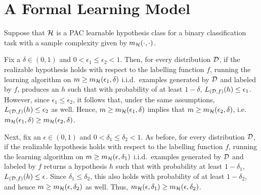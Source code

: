 \chapter{A Formal Learning Model}

\begin{ex}
  Suppose that $\mathcal{H}$ is a PAC learnable hypothesis class for a binary
  classification task with a sample complexity given by $m_{\mathcal{H}}(\cdot,\cdot)$.

  Fix a $\delta\in (0,1)$ and
  $0<\epsilon_1\leq\epsilon_2<1$. Then, for every distribution $\mathcal{D}$, if the
  realizable hypothesis holds with respect to the labelling function $f$,
  running the learning algorithm on $m\geq m_{\mathcal{H}}(\epsilon_1, \delta)$ i.i.d.\
  examples generated by $\mathcal{D}$ and labeled by $f$, produces an $h$
  such that with probability of at least $1-\delta$,
  $L_{(\mathcal{D},f)}(h)\leq \epsilon_1$. However, since
  $\epsilon_1\leq \epsilon_2$, it follows that, under the same assumptions,
  $L_{(\mathcal{D},f)}(h)\leq \epsilon_2$ as well. Hence,
  $m\geq m_{\mathcal{H}}(\epsilon_1, \delta)$
  implies that $m\geq m_{\mathcal{H}}(\epsilon_2, \delta)$, i.e.\
  $m_{\mathcal{H}}(\epsilon_1, \delta)\geq m_{\mathcal{H}}(\epsilon_2, \delta)$.

  Next, fix an $\epsilon\in (0,1)$ and $0<\delta_1\leq\delta_2<1$. As before,
  for every distribution $\mathcal{D}$, if the realizable hypothesis holds with respect
  to the labelling function $f$, running the learning algorithm on
  $m\geq m_{\mathcal{H}}(\epsilon,\delta_1)$ i.i.d.\ examples generated by $\mathcal{D}$ and labeled
  by $f$ returns a hypothesis $h$ such that with probability at least
  $1-\delta_1$, $L_{(\mathcal{D},f)}(h)\leq \epsilon$. Since $\delta_1\leq \delta_2$,
  this also holds with probability of at least $1-\delta_2$, and hence
  $m\geq m_{\mathcal{H}}(\epsilon, \delta_2)$ as well. Thus,
  $m_{\mathcal{H}}(\epsilon, \delta_1)\geq m_{\mathcal{H}}(\epsilon, \delta_2)$.
\end{ex}

